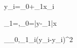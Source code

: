 \hat y_i=\beta_0+\beta_1x_i

\beta_1=,\qquad \beta_0=\bar y-\beta_1\bar x

\min_{\beta_0,\beta_1}\sum_i(y_i-\hat y_i)^2
